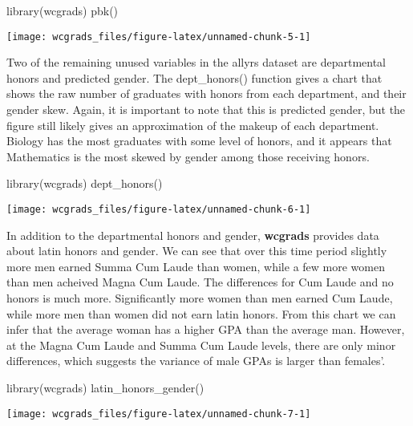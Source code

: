 \begin{Schunk}
\begin{Sinput}
library(wcgrads)
pbk()
\end{Sinput}

\texttt{[image: wcgrads\_files/figure-latex/unnamed-chunk-5-1]} \end{Schunk}

Two of the remaining unused variables in the allyrs dataset are
departmental honors and predicted gender. The dept\_honors() function
gives a chart that shows the raw number of graduates with honors from
each department, and their gender skew. Again, it is important to note
that this is predicted gender, but the figure still likely gives an
approximation of the makeup of each department. Biology has the most
graduates with some level of honors, and it appears that Mathematics is
the most skewed by gender among those receiving honors.

\begin{Schunk}
\begin{Sinput}
library(wcgrads)
dept_honors()
\end{Sinput}

\texttt{[image: wcgrads\_files/figure-latex/unnamed-chunk-6-1]} \end{Schunk}

In addition to the departmental honors and gender, \textbf{wcgrads}
provides data about latin honors and gender. We can see that over this
time period slightly more men earned Summa Cum Laude than women, while a
few more women than men acheived Magna Cum Laude. The differences for
Cum Laude and no honors is much more. Significantly more women than men
earned Cum Laude, while more men than women did not earn latin honors.
From this chart we can infer that the average woman has a higher GPA
than the average man. However, at the Magna Cum Laude and Summa Cum
Laude levels, there are only minor differences, which suggests the
variance of male GPAs is larger than females'.

\begin{Schunk}
\begin{Sinput}
library(wcgrads)
latin_honors_gender()
\end{Sinput}

\texttt{[image: wcgrads\_files/figure-latex/unnamed-chunk-7-1]} \end{Schunk}

